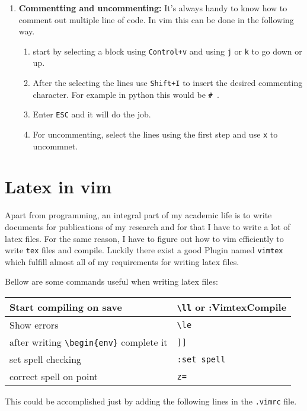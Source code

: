 \documentclass{article}
\begin{document}
\begin{enumerate}
\item {\bfseries Commentting and uncommenting:} It's always handy to know how to
    comment out multiple line of code. In vim this can be done in the following
    way.
    \begin{enumerate}
        \item start by selecting a block using \verb!Control+v! and using
            \verb!j! or \verb!k! to go down or up.
        \item After the selecting the lines use \verb!Shift+I! to insert the
            desired commenting character. For example in python this would be
            \verb!# !. 
        \item Enter \verb!ESC! and it will do the job.
        \item For uncommenting, select the lines using the first step and use
            \verb!x! to uncommnet.
    \end{enumerate}


\end{enumerate}

\section{Latex in vim}
\label{sec:latex-in-vim}
Apart from programming, an integral part of my academic life is to write
documents for publications of my research and for that I have to write a lot of
latex files. For the same reason, I have to figure out how to vim efficiently to
write \verb!tex! files and compile. Luckily there exist a good Plugin named
\verb!vimtex! which fulfill almost all of my requirements for writing latex files.

Bellow are some commands useful when writing latex files:

\begin{longtable}{ll}
\toprule
    Start compiling on save & \verb!\ll! or :VimtexCompile\\ \midrule
    Show errors & \verb!\le! \\ \midrule
    after writing \verb!\begin{env}! complete it & \verb!]]!\\ \midrule
    set spell checking & \verb!:set spell!\\ \midrule
    correct spell on point & \verb!z=!\\ \midrule
\end{longtable}

This could be accomplished just by adding the following lines in the
\verb!.vimrc! file.
\end{document}
